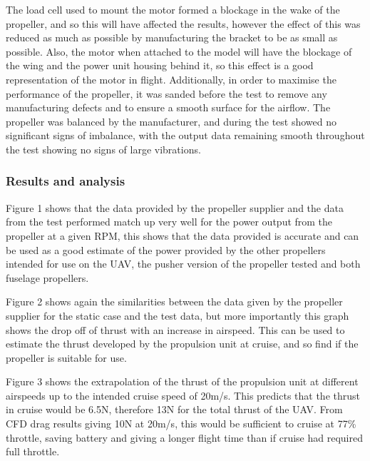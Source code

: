 \documentclass[../../main.tex]{subfiles}
\begin{document}
The load cell used to mount the motor formed a blockage in the wake of the propeller, and so this will have affected the results, however the effect of this was reduced as much as possible by manufacturing the bracket to be as small as possible.
Also, the motor when attached to the model will have the blockage of the wing and the power unit housing behind it, so this effect is a good representation of the motor in flight.
Additionally, in order to maximise the performance of the propeller, it was sanded before the test to remove any manufacturing defects and to ensure a smooth surface for the airflow.
The propeller was balanced by the manufacturer, and during the test showed no significant signs of imbalance, with the output data remaining smooth throughout the test showing no signs of large vibrations. 

\subsubsection{Results and analysis} \label{sec:design-process:interim-design-review:motor-and-propellor-test:results-and-analysis}


Figure 1 shows that the data provided by the propeller supplier and the data from the test performed match up very well for the power output from the propeller at a given RPM, this shows that the data provided is accurate and can be used as a good estimate of the power provided by the other propellers intended for use on the UAV, the pusher version of the propeller tested and both fuselage propellers. 


Figure 2 shows again the similarities between the data given by the propeller supplier for the static case and the test data, but more importantly this graph shows the drop off of thrust with an increase in airspeed.
This can be used to estimate the thrust developed by the propulsion unit at cruise, and so find if the propeller is suitable for use.


Figure 3 shows the extrapolation of the thrust of the propulsion unit at different airspeeds up to the intended cruise speed of 20m/s.
This predicts that the thrust in cruise would be 6.5N, therefore 13N for the total thrust of the UAV.
From CFD drag results giving 10N at 20m/s, this would be sufficient to cruise at 77\% throttle, saving battery and giving a longer flight time than if cruise had required full throttle. 
\end{document}
